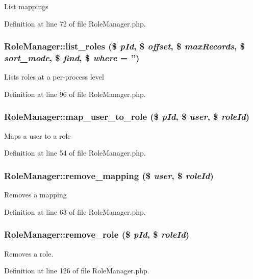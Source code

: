 List mappings 

Definition at line 72 of file Role\-Manager.php.
\subsubsection{\setlength{\rightskip}{0pt plus 5cm}Role\-Manager::list\_\-roles (\$ {\em p\-Id}, \$ {\em offset}, \$ {\em max\-Records}, \$ {\em sort\_\-mode}, \$ {\em find}, \$ {\em where} = '')}\label{classRoleManager_a6}


Lists roles at a per-process level 

Definition at line 96 of file Role\-Manager.php.
\subsubsection{\setlength{\rightskip}{0pt plus 5cm}Role\-Manager::map\_\-user\_\-to\_\-role (\$ {\em p\-Id}, \$ {\em user}, \$ {\em role\-Id})}\label{classRoleManager_a3}


Maps a user to a role 

Definition at line 54 of file Role\-Manager.php.
\subsubsection{\setlength{\rightskip}{0pt plus 5cm}Role\-Manager::remove\_\-mapping (\$ {\em user}, \$ {\em role\-Id})}\label{classRoleManager_a4}


Removes a mapping 

Definition at line 63 of file Role\-Manager.php.
\subsubsection{\setlength{\rightskip}{0pt plus 5cm}Role\-Manager::remove\_\-role (\$ {\em p\-Id}, \$ {\em role\-Id})}\label{classRoleManager_a7}


Removes a role. 

Definition at line 126 of file Role\-Manager.php.
